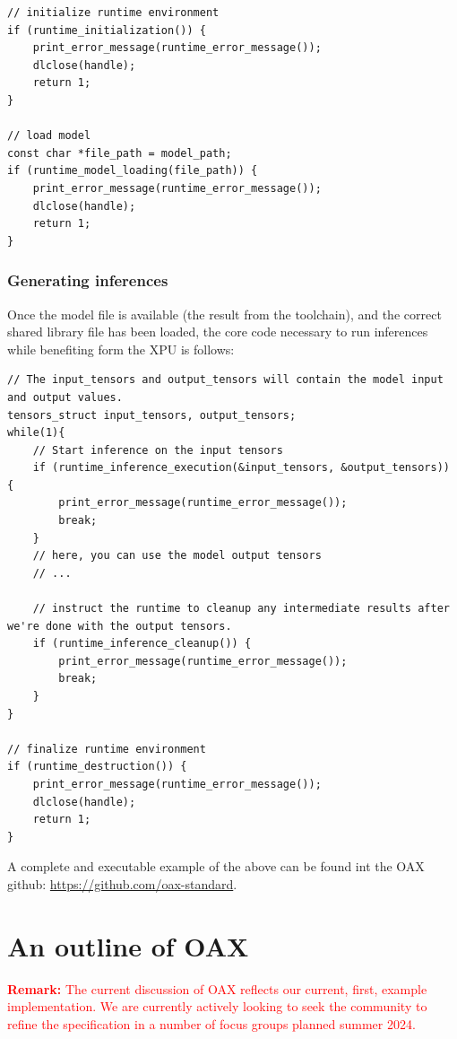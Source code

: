 \documentclass{article}
\newcommand{\remark}[1]{\textcolor{red}{\textbf{\newline Remark:} \newline #1 \newline}}
\newcommand{\oaxgit}{\href{https://github.com/oax-standard}{https://github.com/oax-standard}}
\begin{document}
\begin{lstlisting}
// initialize runtime environment
if (runtime_initialization()) {
    print_error_message(runtime_error_message());
    dlclose(handle);
    return 1;
}

// load model
const char *file_path = model_path;
if (runtime_model_loading(file_path)) {
    print_error_message(runtime_error_message());
    dlclose(handle);
    return 1;
}
\end{lstlisting}

\subsubsection{Generating inferences}

Once the model file is available (the result from the toolchain), and the correct shared library file has been loaded, the core code necessary to run inferences while benefiting form the XPU is follows:

\begin{lstlisting}
// The input_tensors and output_tensors will contain the model input and output values.
tensors_struct input_tensors, output_tensors;
while(1){
    // Start inference on the input tensors
    if (runtime_inference_execution(&input_tensors, &output_tensors)) {
        print_error_message(runtime_error_message());
        break;
    }
    // here, you can use the model output tensors
    // ...

    // instruct the runtime to cleanup any intermediate results after we're done with the output tensors.
    if (runtime_inference_cleanup()) {
        print_error_message(runtime_error_message());
        break;
    }
}

// finalize runtime environment
if (runtime_destruction()) {
    print_error_message(runtime_error_message());
    dlclose(handle);
    return 1;
}
\end{lstlisting}

A complete and executable example of the above can be found int the OAX github: \oaxgit.

\newpage
\section{An outline of OAX}
\label{sec:oax-outline}

\remark{The current discussion of OAX reflects our current, first, example implementation. We are currently actively looking to seek the community to refine the specification in a number of focus groups planned summer 2024.}
\end{document}
